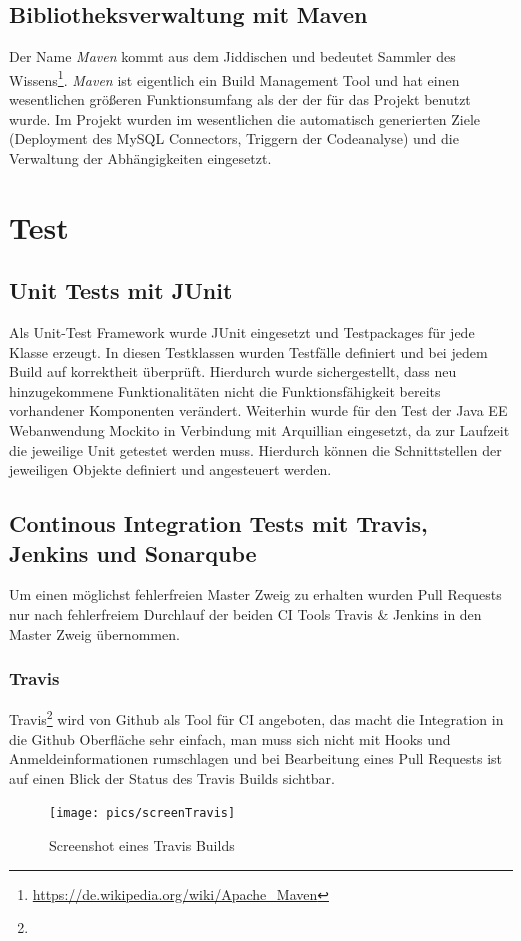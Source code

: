 \documentclass[12pt,a4paper,parskip]{scrreprt}
\begin{document}
\subsection{Bibliotheksverwaltung mit Maven}
Der Name \textit{Maven} kommt aus dem Jiddischen und bedeutet
\glqq Sammler des Wissens\grqq \footnote{\url{https://de.wikipedia.org/wiki/Apache_Maven}}.
\textit{Maven} ist eigentlich ein Build Management Tool und hat einen wesentlichen größeren Funktionsumfang als der der für das Projekt benutzt wurde. Im Projekt wurden im wesentlichen die automatisch generierten Ziele (Deployment des MySQL Connectors, Triggern der Codeanalyse) und die Verwaltung der Abhängigkeiten eingesetzt.
\section{Test}
\subsection{Unit Tests mit JUnit}
Als Unit-Test Framework wurde JUnit eingesetzt und Testpackages für jede Klasse erzeugt. In diesen Testklassen wurden Testfälle definiert und bei jedem Build auf korrektheit überprüft. Hierdurch wurde sichergestellt, dass neu hinzugekommene Funktionalitäten nicht die Funktionsfähigkeit bereits vorhandener Komponenten verändert.
Weiterhin wurde für den Test der Java EE Webanwendung Mockito in Verbindung mit Arquillian eingesetzt, da zur Laufzeit die jeweilige Unit getestet werden muss. Hierdurch können die Schnittstellen der jeweiligen Objekte definiert und angesteuert werden.
\subsection{Continous Integration Tests mit Travis, Jenkins und Sonarqube}
Um einen möglichst fehlerfreien Master Zweig zu erhalten wurden Pull Requests nur nach fehlerfreiem Durchlauf der beiden CI Tools Travis \& Jenkins in den Master Zweig übernommen.

\subsubsection{Travis}
Travis\footnote{} wird von Github als Tool für CI angeboten, das macht die Integration in die Github Oberfläche sehr einfach, man muss sich nicht mit Hooks und Anmeldeinformationen rumschlagen und bei Bearbeitung eines Pull Requests ist auf einen Blick der Status des Travis Builds sichtbar.
\begin{figure}[!hbtp]%
\centering
\texttt{[image: pics/screenTravis]}
\caption[Travis]{Screenshot eines Travis Builds}
\label{fig:screenTravis}
\end{figure}
\end{document}
